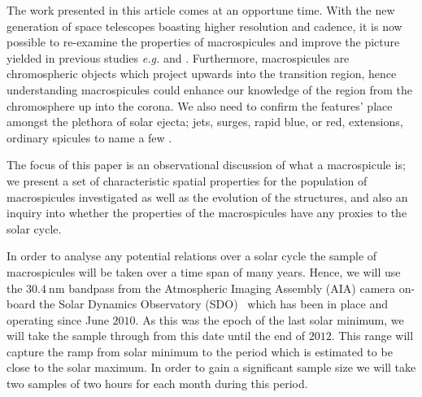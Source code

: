 The work presented in this article comes at an opportune time. With the new generation of space telescopes boasting higher resolution and cadence, it is now possible to re-examine the properties of macrospicules and improve the picture yielded in previous studies \emph{e.g.} \cite{Bohlin1975} and \cite{Dere89}. Furthermore, macrospicules are chromospheric objects which project upwards into the transition region, hence understanding macrospicules could enhance our knowledge of the region from the chromosphere up into the corona. We also need to confirm the features' place amongst the plethora of solar ejecta; jets, surges, rapid blue, or red, extensions, ordinary spicules to name a few \cite{Tsiropoula2012}.

The focus of this paper is an observational discussion of what a macrospicule is; we present a set of characteristic spatial properties for the population of macrospicules investigated as well as the evolution of the structures, and also an inquiry into whether the properties of the macrospicules have any proxies to the solar cycle.

In order to analyse any potential relations over a solar cycle the sample of macrospicules will be taken over a time span of many years. Hence, we will use the $30.4\ \textrm{nm}$ bandpass from the Atmospheric Imaging Assembly (AIA) camera on-board the Solar Dynamics Observatory (SDO) \cite{AIAspec}\, which has been in place and operating since June $2010$. As this was the epoch of the last solar minimum, we will take the sample through from this date until the end of $2012$. This range will capture the ramp from solar minimum to the period which is estimated to be close to the solar maximum. In order to gain a significant sample size we will take two samples of two hours for each month during this period.

